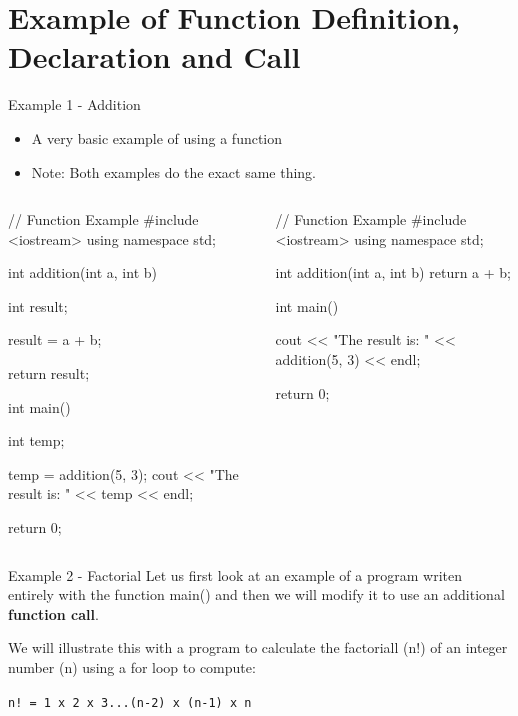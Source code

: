 \documentclass[../lecture4-functions.tex]{subfiles}
\begin{document}
\section{Example of Function Definition, Declaration and Call}


\begin{frame}[fragile]{Example 1 - Addition}
    \begin{itemize}
        \item A very basic example of using a function
        \item Note: Both examples do the exact same thing.
    \end{itemize}

    \begin{columns}[T,onlytextwidth]
            \begin{cppcode}[lastline = 22]
// Function Example
#include <iostream>
using namespace std;

int addition(int a, int b)
{
    int result;

    result = a + b;

    return result;
}

int main()
{
    int temp;

    temp = addition(5, 3);
    cout << "The result is: " << temp << endl;

    return 0;
}
            \end{cppcode}
                \begin{cppcode}[lastline = 15]
// Function Example
#include <iostream>
using namespace std;

int addition(int a, int b)
{
    return a + b;
}

int main()
{
    cout << "The result is: " << addition(5, 3) << endl;

    return 0;
}
                \end{cppcode}
    \end{columns}
\end{frame}


\begin{frame}[fragile]{Example 2 - Factorial}
    Let us first look at an example of a program writen entirely with the function main() and then we will modify it to use an additional \textbf{function call}. \newline

    We will illustrate this with a program to calculate the factoriall (n!) of an integer number (n) using a for loop to compute:

    \verb|n! = 1 x 2 x 3...(n-2) x (n-1) x n|
\end{frame}
\end{document}
